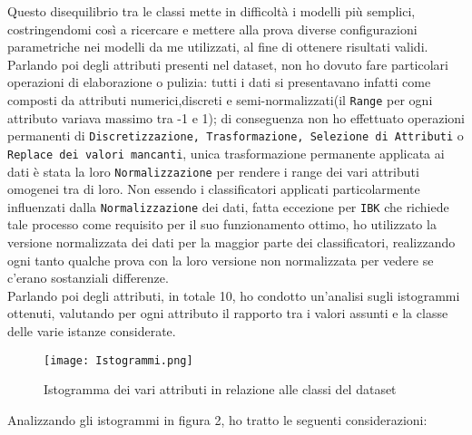 Questo disequilibrio tra le classi mette in difficoltà i modelli più semplici, costringendomi così a ricercare e mettere alla prova diverse configurazioni parametriche nei modelli da me utilizzati, al fine di ottenere risultati validi.
Parlando poi degli attributi presenti nel dataset, non ho dovuto fare particolari operazioni di elaborazione o pulizia: tutti i dati si presentavano infatti come composti da attributi numerici,discreti e semi-normalizzati(il \texttt{Range} per ogni attributo variava massimo tra -1 e 1); di conseguenza non ho effettuato operazioni permanenti di \texttt{Discretizzazione, Trasformazione, Selezione di Attributi} o \texttt{Replace dei valori mancanti}, unica trasformazione permanente applicata ai dati è stata la loro \texttt{Normalizzazione} per rendere i range dei vari attributi omogenei tra di loro.
Non essendo i classificatori applicati particolarmente influenzati dalla \texttt{Normalizzazione} dei dati, fatta eccezione per \texttt{IBK} che richiede tale processo come requisito per il suo funzionamento ottimo, ho utilizzato la versione normalizzata dei dati per la maggior parte dei classificatori, realizzando ogni tanto qualche prova con la loro versione non normalizzata per vedere se c'erano sostanziali differenze.\\
Parlando poi degli attributi, in totale 10, ho condotto un'analisi sugli istogrammi ottenuti, valutando per ogni attributo il rapporto tra i valori assunti e la classe delle varie istanze considerate.

 \begin{figure}[h!]
	\texttt{[image: Istogrammi.png]}
	\caption{Istogramma dei vari attributi in relazione alle classi del dataset}
\end{figure}

Analizzando gli istogrammi in figura 2, ho tratto le seguenti considerazioni:

